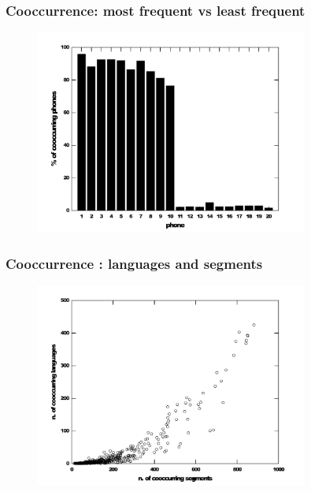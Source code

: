 \documentclass[notes]{beamer}
\begin{document}
\frame
{
  \frametitle{Cooccurrence: most frequent vs least frequent}
  \vspace{-0.5cm}
  \begin{figure}[h!]
  \centering
  \includegraphics[width=0.8\textwidth]{images/numper_cooccurring_phones_10.pdf}
  \label{fig:numper_cooccurring_phones_10}
  \end{figure} 
}

\frame
{
  \frametitle{Cooccurrence : languages and segments}
  \vspace{-0.3cm}
  \begin{figure}[h!]
  \centering
  \includegraphics[width=0.8\textwidth]{images/coocc_of_speech_sounds.pdf}
  \label{fig:coocc_of_speech_sounds}
  \end{figure} 
}
\end{document}
